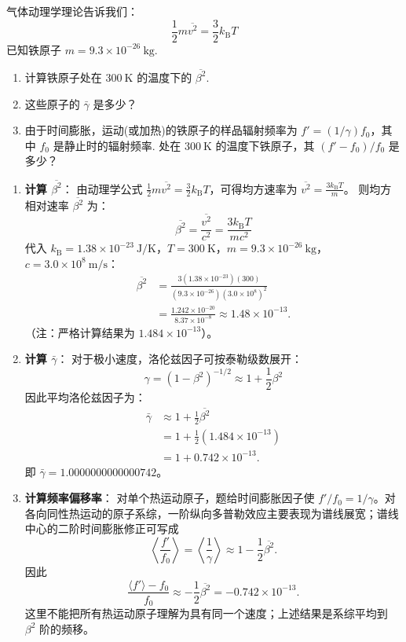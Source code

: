 \begin{exercise}\label{ex:9.4}
气体动理学理论告诉我们：
$$ \frac{1}{2}m\overline{v^2} = \frac{3}{2}k_{\mathrm{B}}T $$
已知铁原子 $m = 9.3 \times 10^{-26} \ \mathrm{kg}$.
\begin{enumerate}
  \item[(a)] 计算铁原子处在 $300 \ \mathrm{K}$ 的温度下的 $\overline{\beta^2}$.
  \item[(b)] 这些原子的 $\bar{\gamma}$ 是多少？
  \item[(c)] 由于时间膨胀，运动(或加热)的铁原子的样品辐射频率为 $f' = (1/\gamma)f_0$，其中 $f_0$ 是静止时的辐射频率. 处在 $300 \ \mathrm{K}$ 的温度下铁原子，其 $(f' - f_0)/f_0$ 是多少？
\end{enumerate}
\end{exercise}
\begin{solution}
\begin{enumerate}
    \item[(a)] \textbf{计算 $\overline{\beta^2}$}：
    由动理学公式 $\frac{1}{2} m \overline{v^2} = \frac{3}{2} k_{\mathrm{B}} T$，可得均方速率为 $\overline{v^2} = \frac{3 k_{\mathrm{B}} T}{m}$。
    则均方相对速率 $\overline{\beta^2}$ 为：
    $$ \overline{\beta^2} = \frac{\overline{v^2}}{c^2} = \frac{3 k_{\mathrm{B}} T}{m c^2} $$
    代入 $k_{\mathrm{B}} = 1.38 \times 10^{-23} \ \mathrm{J/K}$，$T = 300 \ \mathrm{K}$，$m = 9.3 \times 10^{-26} \ \mathrm{kg}$，$c = 3.0 \times 10^8 \ \mathrm{m/s}$：
    \[
    \begin{aligned}
    \overline{\beta^2}
      &= \frac{3(1.38\times10^{-23})(300)}{(9.3\times10^{-26})(3.0\times10^8)^2}\\
      &= \frac{1.242\times10^{-20}}{8.37\times10^{-8}}
       \approx 1.48\times10^{-13}.
    \end{aligned}
    \]
    （注：严格计算结果为 $1.484 \times 10^{-13}$）。

    \item[(b)] \textbf{计算 $\bar{\gamma}$}：
    对于极小速度，洛伦兹因子可按泰勒级数展开：
    $$ \gamma = (1 - \beta^2)^{-1/2} \approx 1 + \frac{1}{2}\beta^2 $$
    因此平均洛伦兹因子为：
    \[
    \begin{aligned}
    \bar{\gamma}
      &\approx 1+\frac12\overline{\beta^2}\\
      &=1+\frac12(1.484\times10^{-13})\\
      &=1+0.742\times10^{-13}.
    \end{aligned}
    \]
    即 $\bar{\gamma} = 1.0000000000000742$。

    \item[(c)] \textbf{计算频率偏移率}：
    对单个热运动原子，题给时间膨胀因子使 $f'/f_0=1/\gamma$。对各向同性热运动的原子系综，一阶纵向多普勒效应主要表现为谱线展宽；谱线中心的二阶时间膨胀修正可写成
    $$ \left\langle\frac{f'}{f_0}\right\rangle
       =\left\langle\frac{1}{\gamma}\right\rangle
       \approx 1-\frac12\overline{\beta^2}. $$
    因此
    $$ \frac{\langle f'\rangle-f_0}{f_0}
       \approx-\frac12\overline{\beta^2}
       =-0.742\times10^{-13}. $$
    这里不能把所有热运动原子理解为具有同一个速度；上述结果是系综平均到 $\beta^2$ 阶的频移。
\end{enumerate}
\end{solution}

